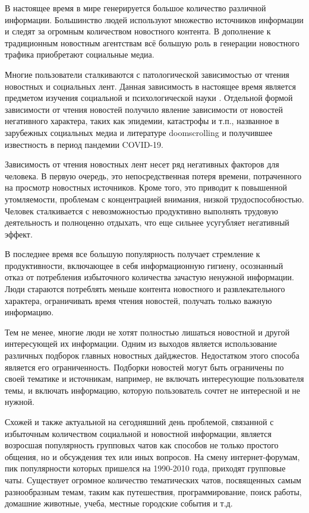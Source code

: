 \aftertitle

В настоящее время в мире генерируется большое количество различной информации. Большинство людей используют множество источников информации и следят за огромным количеством новостного контента. В дополнение к традиционным новостным агентствам всё большую роль в генерации новостного трафика приобретают социальные медиа.

Многие пользователи сталкиваются с патологической зависимостью от чтения новостных и социальных лент. Данная зависимость в настоящее время является предметом изучения социальной и психологической науки \cite{news_addiction}. Отдельной формой зависимости от чтения новостей получило явление зависимости от новостей негативного характера, таких как эпидемии, катастрофы и т.п., названное в зарубежных социальных медиа и литературе doomscrolling \cite{doomscrolling} и получившее известность в период пандемии COVID-19.

Зависимость от чтения новостных лент несет ряд негативных факторов для человека. В первую очередь, это непосредственная потеря времени, потраченного на просмотр новостных источников. Кроме того, это приводит к повышенной утомляемости, проблемам с концентрацией внимания, низкой трудоспособностью. Человек сталкивается с невозможностью продуктивно выполнять трудовую деятельность и полноценно отдыхать, что еще сильнее усугубляет негативный эффект.

В последнее время все большую популярность получает стремление к продуктивности, включающее в себя информационную гигиену, осознанный отказ от потребления избыточного количества зачастую ненужной информации. Люди стараются потреблять меньше контента новостного и развлекательного характера, ограничивать время чтения новостей, получать только важную информацию.

Тем не менее, многие люди не хотят полностью лишаться новостной и другой интересующей их информации. Одним из выходов является использование различных подборок главных новостных дайджестов. Недостатком этого способа является его ограниченность. Подборки новостей могут быть ограничены по своей тематике и источникам, например, не включать интересующие пользователя темы, и включать информацию, которую пользователь сочтет не интересной и не нужной.

Схожей и также актуальной на сегодняшний день проблемой, связанной с избыточным количеством социальной и новостной информации, является возросшая популярность групповых чатов как способов не только простого общения, но и обсуждения тех или иных вопросов. На смену интернет-форумам, пик популярности которых пришелся на 1990-2010 года, приходят групповые чаты. Существует огромное количество тематических чатов, посвященных самым разнообразным темам, таким как путешествия, программирование, поиск работы, домашние животные, учеба, местные городские события и т.д.

